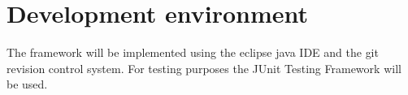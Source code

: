 \section{Development environment}

The framework will be implemented using the \Gls{eclipse} \gls{java} \gls{IDE} and the \Gls{git} revision control system. For testing purposes the JUnit Testing Framework will be used.

